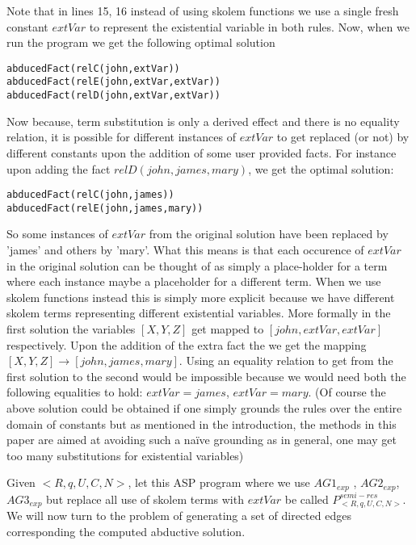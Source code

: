 Note that in lines 15, 16 instead of using skolem functions we use a single
fresh constant $extVar$ to represent the existential variable in both
rules. Now, when we run the program we get the following optimal solution

\begin{lstlisting}[frame=none]
abducedFact(relC(john,extVar))
abducedFact(relE(john,extVar,extVar))
abducedFact(relD(john,extVar,extVar))    
\end{lstlisting}

Now because, term substitution is only a derived effect and there is no
equality relation, it is possible for different instances of $extVar$ to get
replaced (or not) by different constants upon the addition of some user
provided facts. For instance upon adding the fact $relD(john,james,mary)$, we get
the optimal solution:

\begin{lstlisting}[frame=none]
abducedFact(relC(john,james))
abducedFact(relE(john,james,mary))    
\end{lstlisting}

So some instances of $extVar$ from the original solution have been replaced by 'james' and others by 'mary'. What this means is that each occurence of $extVar$ in the original solution can be thought of as simply a place-holder for a term where each instance maybe a placeholder for a different term. When we use skolem functions instead this is simply more explicit because we have different skolem terms representing different existential variables. More formally in the first solution the variables $[X,Y,Z]$ get mapped to $[john, extVar,extVar]$ respectively. Upon the addition of the extra fact the we get the mapping $[X,Y,Z]\rightarrow[john,james,mary]$. Using an equality relation to get from the first solution to the second would be impossible because we would need both the following equalities to hold: $extVar = james$, $extVar = mary$. (Of course the above solution could be obtained if one simply grounds the rules over the entire domain of constants but as mentioned in the introduction, the methods in this paper are aimed at avoiding such a naïve grounding as in general, one may get too many substitutions for existential variables)


Given $<R,q,U,C,N>$, let this ASP program where we use $AG1_{exp}$ , $AG2_{exp}$, $AG3_{exp}$ but replace all use of skolem terms with $extVar$ be called $P_{<R,q,U,C,N>}^{semi-res}$.\\ We will now turn to the problem of generating a set of directed edges corresponding the computed abductive solution.



